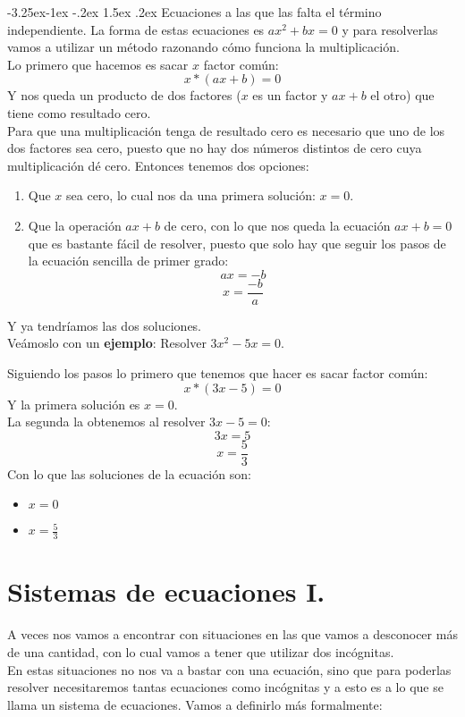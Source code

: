 \documentclass[a4paper,11pt,answers]{exam}
\makeatletter
\renewcommand\paragraph{\@startsection{paragraph}{4}{\z@}%
                                     {-3.25ex\@plus -1ex \@minus -.2ex}%
                                     {1.5ex \@plus .2ex}%
                                     {\normalfont\normalsize\bfseries}}
\makeatother
\begin{document}
  \paragraph{Ecuaciones a las que las falta el término independiente}.
    La forma de estas ecuaciones es $ax^2 + bx = 0$ y para resolverlas vamos a utilizar un método razonando cómo funciona la multiplicación.\\
    Lo primero que hacemos es sacar $x$ factor común:
    \[x*(ax + b) = 0\]
    Y nos queda un producto de dos factores ($x$ es un factor y $ax + b$ el otro) que tiene como resultado cero.\\
    Para que una multiplicación tenga de resultado cero es necesario que uno de los dos factores sea cero, puesto que no hay dos números distintos de cero cuya multiplicación dé cero. Entonces tenemos dos opciones:
    \begin{enumerate}
    \item Que $x$ sea cero, lo cual nos da una primera solución: $x=0$.
    \item Que la operación $ax+b$ de cero, con lo que nos queda la ecuación $ax+b = 0$ que es bastante fácil de resolver, puesto que solo hay que seguir los pasos de la ecuación sencilla de primer grado:
      \[ax = -b\]
      \[x = \frac{-b}{a}\]
    \end{enumerate}
    Y ya tendríamos las dos soluciones.\\
    Veámoslo con un \textbf{ejemplo}: Resolver $3x^2 - 5x = 0$.
    \begin{solution}  
      Siguiendo los pasos lo primero que tenemos que hacer es sacar factor común:
      \[x*(3x - 5) = 0\]
      Y la primera solución es $x=0$.\\
      La segunda la obtenemos al resolver $3x-5=0$:
      \[3x = 5\]
      \[x = \frac{5}{3}\]
      Con lo que las soluciones de la ecuación son:
      \begin{itemize}
      \item $x=0$
      \item $x = \frac{5}{3}$
      \end{itemize}
      
    \end{solution}
    

  \section{Sistemas de ecuaciones I.}\label{sistemasI}
  A veces nos vamos a encontrar con situaciones en las que vamos a desconocer más de una cantidad, con lo cual vamos a tener que utilizar dos incógnitas.\\
  En estas situaciones no nos va a bastar con una ecuación, sino que para poderlas resolver necesitaremos tantas ecuaciones como incógnitas y a esto es a lo que se llama un sistema de ecuaciones. Vamos a definirlo más formalmente:\\
  
\end{document}
